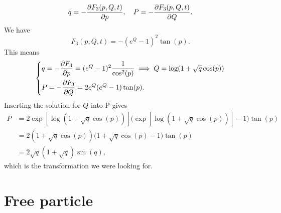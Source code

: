\documentclass{article}
\begin{document}
    \begin{equation*}
        q = - \pdv{F_3(p, Q, t)}{p}, \quad P = - \pdv{F_3(p, Q, t)}{Q}.
    \end{equation*}
    We have
    \begin{equation*}
        F_3(p, Q, t) = -(e^Q - 1)^2 \tan(p).
    \end{equation*}
    This means
    \begin{equation*}
        \begin{dcases*}
            q = - \pdv{F_3}{p} = (e^Q - 1)^2 \frac{1}{\cos^2(p)} \implies Q = \log(1 + \sqrt q \cos(p))\\
            P = - \pdv{F_3}{Q} = 2 e^Q(e^Q - 1) \tan(p).
        \end{dcases*}
    \end{equation*}
    Inserting the solution for $Q$ into P gives
    \begin{align*}
        P&= 2 \exp\left[\log(1 + \sqrt q \cos(p))\right]\Big(\exp\left[\log(1 + \sqrt q \cos(p))\right]  -1\Big)\tan(p)  \\
        & = 2(1 + \sqrt{q} \cos(p))\Big( 1 + \sqrt q \cos(p) - 1\Big)\tan(p) \\
        & = 2 \sqrt q (1 + \sqrt q) \sin(q),
    \end{align*}
    which is the transformation we were looking for.

    \section{Free particle}
 
\end{document}
